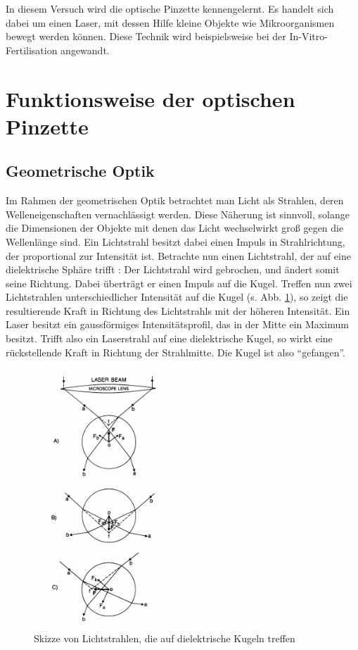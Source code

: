 In diesem Versuch wird die optische Pinzette kennengelernt. Es handelt sich dabei um einen Laser, mit dessen Hilfe kleine Objekte wie Mikroorganismen bewegt werden können. Diese Technik wird beispielsweise bei der In-Vitro-Fertilisation angewandt.

\section{Funktionsweise der optischen Pinzette}

\subsection{Geometrische Optik}
\label{sec:gradient}
Im Rahmen der geometrischen Optik betrachtet man Licht als Strahlen, deren Welleneigenschaften vernachlässigt werden. Diese Näherung ist sinnvoll, solange die Dimensionen der Objekte mit denen das Licht wechselwirkt groß gegen die Wellenlänge sind.
Ein Lichtstrahl besitzt dabei einen Impuls in Strahlrichtung, der proportional zur Intensität ist. Betrachte nun einen Lichtstrahl, der auf eine dielektrische Sphäre trifft \cite{Ashkin}: 
Der Lichtstrahl wird gebrochen, und ändert somit seine Richtung. Dabei überträgt er einen Impuls auf die Kugel. Treffen nun zwei Lichtstrahlen  unterschiedlicher Intensität auf die Kugel (s. Abb. \ref{fig:geom_optik}), so zeigt die resultierende Kraft in Richtung des Lichtstrahls mit der höheren Intensität.
Ein Laser besitzt ein gaussförmiges Intensitätsprofil, das in der Mitte ein Maximum besitzt. Trifft also ein Laserstrahl auf eine dielektrische Kugel, so wirkt eine rückstellende Kraft in Richtung der Strahlmitte. Die Kugel ist also ``gefangen''.

\begin{figure}[h]
	\centering\includegraphics[width=0.5\textwidth]{fig/geom_optik.png}
	\caption{Skizze von Lichtstrahlen, die auf dielektrische Kugeln treffen \cite{Ashkin}}
	\label{fig:geom_optik}
\end{figure}


